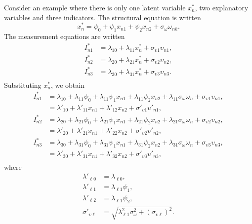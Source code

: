 \documentclass[12pt,a4paper]{article}
\begin{document}
Consider an example where there is only one latent variable $x^*_n$, two explanatory variables and three indicators. The structural equation  is written
\[
x^*_n = \psi_0 + \psi_1 x_{n1} + \psi_2 x_{n2} + \sigma_\omega \omega_{nk}.
\]
The measurement equations  are written
\[
\begin{aligned}
I^*_{n1} &= \lambda_{10} +\lambda_{11}  x_{n}^* + \sigma_{\upsilon 1} \upsilon_{n1}, \\
I^*_{n2} &= \lambda_{20} +\lambda_{21}  x_{n}^* + \sigma_{\upsilon 2} \upsilon_{n2}, \\
I^*_{n3} &= \lambda_{30} +\lambda_{31}  x_{n}^* + \sigma_{\upsilon 3} \upsilon_{n3}. \\
\end{aligned}
\]
Substituting $x^*_n$, we obtain
\[
\begin{aligned}
I^*_{n1} &= \lambda_{10} + \lambda_{11}\psi_0 + \lambda_{11}\psi_1  x_{n1} + \lambda_{11}\psi_2 x_{n2} + \lambda_{11}\sigma_\omega \omega_n + \sigma_{\upsilon 1} \upsilon_{n1}, \\
        &= \lambda'_{10}+ \lambda'_{11} x_{n1} + \lambda'_{12} x_{n2} + \sigma'_{\upsilon 1} \upsilon'_{n1}, \\
I^*_{n2} &= \lambda_{20}+\lambda_{21} \psi_0 + \lambda_{21}\psi_1  x_{n1} + \lambda_{21}\psi_2 x_{n2} + \lambda_{21}\sigma_\omega \omega_n + \sigma_{\upsilon 2} \upsilon_{n2}, \\
        &= \lambda'_{20}+ \lambda'_{21} x_{n1} + \lambda'_{22} x_{n2} + \sigma'_{\upsilon 2} \upsilon'_{n2}, \\
I^*_{n3} &= \lambda_{30} +\lambda_{31}  \psi_0 + \lambda_{31}\psi_1  x_{n1} + \lambda_{31}\psi_2 x_{n2} + \lambda_{31}\sigma_\omega \omega_n + \sigma_{\upsilon 3} \upsilon_{n3}, \\
        &= \lambda'_{30}+ \lambda'_{31} x_{n1} + \lambda'_{32} x_{n2} + \sigma'_{\upsilon 3} \upsilon'_{n3}, \\
\end{aligned}
\]
where
\begin{align*}
  \lambda'_{\ell 0} &= \lambda_{\ell 0}, \\
  \lambda'_{\ell 1} &=\lambda_{\ell 1}\psi_1,\\
  \lambda'_{\ell 2} &=\lambda_{\ell 1}\psi_2, \\
  \sigma'_{\upsilon \ell} &= \sqrt{\lambda_{\ell 1}^2\sigma_\omega^2 + (\sigma_{\upsilon \ell})^2}.
\end{align*}
\end{document}
